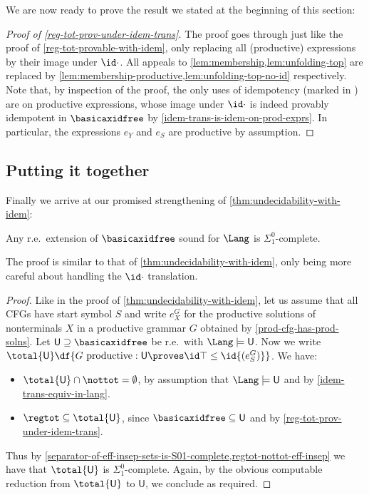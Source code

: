 \documentclass[runningheads]{amsart}
\begin{document}
We are now ready to prove the result we stated at the beginning of this section:

\begin{proof}
    [Proof of \cref{reg-tot-prov-under-idem-trans}]
    The proof goes through just like the proof of \cref{reg-tot-provable-with-idem}, only replacing all (productive) expressions by their image under $\id \cdot$.
    All appeals to \cref{lem:membership,lem:unfolding-top} are replaced by \cref{lem:membership-productive,lem:unfolding-top-no-id} respectively.
    Note that, by inspection of the proof, the only uses of idempotency (marked in ) are on productive expressions, whose image under $\id \cdot$ is indeed provably idempotent in $\basicaxidfree$ by \cref{idem-trans-is-idem-on-prod-exprs}.
    In particular, the expressions $e_Y$ and $e_S$ are productive by assumption.
\end{proof}

\subsection{Putting it together}
Finally we arrive at our promised strengthening of \cref{thm:undecidability-with-idem}:
\begin{theorem}
\label{thm:undecidability-without-idem}
    Any r.e.\ extension of $\basicaxidfree$ sound for $\Lang$ is $\Sigma^0_1$-complete.
\end{theorem}
The proof is similar to that of \cref{thm:undecidability-with-idem}, only being more careful about handling the $\id\cdot$ translation.
\begin{proof}
    Like in the proof of \cref{thm:undecidability-with-idem}, let us assume that all CFGs have start symbol $S$ and write $e^G_X$ for the productive solutions of nonterminals $X$ in a productive grammar $G$ obtained by \cref{prod-cfg-has-prod-solns}.
    Let $\mathsf U \supseteq \basicaxidfree$ be r.e.\ with $\Lang \models \mathsf U$.
    Now we write $\total{\mathsf U} \df \{G \text{ productive}: \mathsf U \proves \id \top \leq \id{(e^G_S)}\}$. We have:
    \begin{itemize}
        \item $\total {\mathsf U} \cap \nottot = \emptyset$, by assumption that $\Lang \models \mathsf U $ and by \cref{idem-trans-equiv-in-lang}.
        \item $\regtot \subseteq \total{\mathsf U}$, since $\basicaxidfree\subseteq \mathsf U$ and by \cref{reg-tot-prov-under-idem-trans}.
    \end{itemize}
    Thus by \cref{separator-of-eff-insep-sets-is-S01-complete,regtot-nottot-eff-insep} we have that $\total{\mathsf U}$ is $\Sigma^0_1$-complete.
    Again, by the obvious computable reduction from $\total{\mathsf U}$ to $\mathsf U$, we conclude as required. 
\end{proof}
\end{document}
